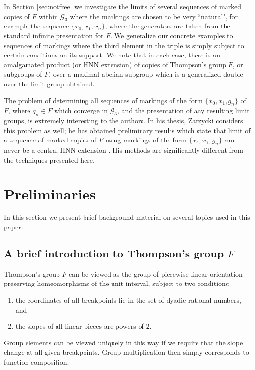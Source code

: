 \documentclass[11pt]{amsart}
\begin{document}
In Section \ref{sec:notfree} we investigate the limits of several
sequences of marked copies of $F$ within ${\mathcal G}_3$ where
the markings are chosen to be very ``natural", for example the
sequence $\{x_0,x_1,x_n\}$, where the generators are taken from
the standard infinite presentation for $F$.  We generalize our
concrete examples to sequences of markings where the third element
in the triple is simply subject to certain conditions on its
support.  We note that in each case, there is an amalgamated product (or HNN extension) of copies
of Thompson's group $F$, or subgroups of $F$, over a maximal abelian subgroup which is a generalized double over the limit group obtained.

The problem of determining all sequences of
markings of the form $\{x_0,x_1,g_n\}$ of $F$, where $g_n\in F$
which converge in ${\mathcal G}_3$, and the presentation of any
resulting limit groups, is extremely interesting to the authors.
In his thesis, Zarzycki considers this problem as well; he
has obtained preliminary results which state that limit of a
sequence of marked copies of $F$ using markings of the form
$\{x_0,x_1,g_n\}$ can never be a central HNN-extension  \cite{Z1,Z2}.  His
methods are significantly different from the techniques presented
here.

\section{Preliminaries}

In this section we present brief background material on several topics used in this paper.

\subsection{A brief introduction to Thompson's group $F$}
\label{sec:introF}

Thompson's group $F$ can be viewed as the group of piecewise-linear orientation-preserving homeomorphisms of the unit interval, subject to two conditions:
\begin{enumerate}
\item the coordinates of all breakpoints lie in the set of dyadic rational numbers, and
\item the slopes of all linear pieces are powers of $2$.
\end{enumerate}
Group elements can be viewed uniquely in this way if we require that the slope change at all given breakpoints.  Group multiplication then simply corresponds to function composition.
\end{document}
